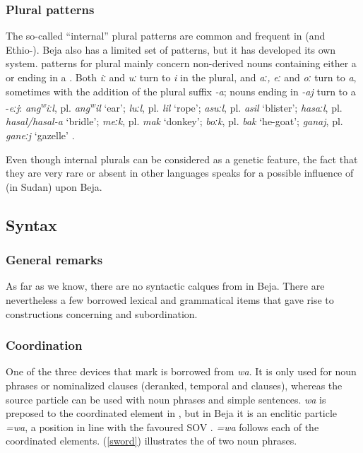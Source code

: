 \documentclass[output=paper]{langsci/langscibook}
\begin{document}
 \subsubsection{Plural patterns}

The so-called “internal” plural patterns are common and frequent in  (and Ethio-). Beja also has a limited set of  patterns, but it has developed its own system.  patterns for plural  mainly concern non-derived nouns containing either a  or ending in a . Both \textit{iː} and \textit{uː} turn to \textit{i} in the plural, and \textit{aː,} \textit{eː} and \textit{oː} turn to \textit{a}, sometimes with the addition of the plural suffix \textit{{}-}\textit{a}; nouns ending in \textit{{}-}\textit{aj} turn to a  \nobreakdash-\textit{eːj}:  \textit{ang\textsuperscript{w}}\textit{iːl}, pl. \textit{ang\textsuperscript{w}}\textit{il} ‘ear’; \textit{luːl}, pl. \textit{lil} ‘rope’; \textit{asuːl}, pl. \textit{asil} ‘blister’; \textit{hasaːl}, pl. \textit{hasal/hasal-a} ‘bridle’; \textit{meːk}, pl. \textit{mak} ‘donkey’; \textit{boːk}, pl. \textit{bak} ‘he-goat’; \textit{ganaj}, pl. \textit{ganeːj} ‘gazelle’ \citep{Vanhove2017}. 

Even though internal plurals can be considered as a genetic feature, the fact that they are very rare or absent in other  languages \citep{Zaborski1986} speaks for a possible influence of  (in Sudan) upon Beja.


 
 \subsection{Syntax}
 \subsubsection{General remarks}

As far as we know, there are no syntactic calques from  in Beja. There are nevertheless a few borrowed lexical and grammatical items that gave rise to constructions concerning  and subordination.


 \subsubsection{Coordination}

One of the three devices that mark  is borrowed from  \textit{wa}. It is only used for noun phrases or nominalized clauses (deranked, temporal and  clauses), whereas the  source particle can be used with noun phrases and simple sentences. \textit{wa} is preposed to the coordinated element in , but in Beja it is an enclitic particle \textit{=wa}, a position in line with the favoured SOV . \textit{=wa} follows each of the coordinated elements. (\ref{sword}) illustrates the  of two noun phrases.
\end{document}
